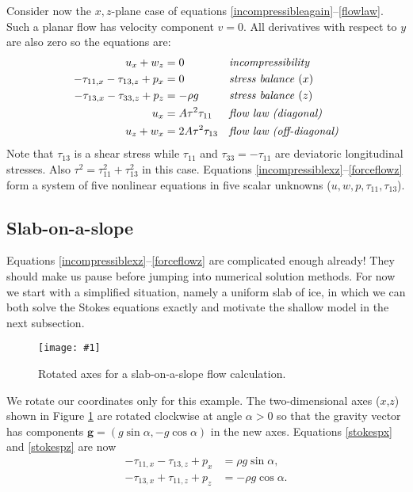 \documentclass[letterpaper,final,12pt,reqno]{amsart}
\newcommand{\onefigsize}[3]{
\begin{figure}[ht]
\centering
\texttt{[image: \#1]}
\caption{#2}
\label{fig:#1}
\end{figure}}
\newcommand{\onefig}[2]{\onefigsize{#1}{#2}{3.0in}}
\begin{document}
Consider now the $x,z$-plane case of equations \eqref{incompressibleagain}--\eqref{flowlaw}.  Such a planar flow has velocity component $v=0$.  All derivatives with respect to $y$ are also zero so the equations are:
\begin{align}
u_x + w_z &= 0 &&\text{\emph{incompressibility}} \label{incompressiblexz} \\
- \tau_{11,x} - \tau_{13,z} + p_x &= 0 &&\text{\emph{stress balance} ($x$)} \label{stokespx} \\
- \tau_{13,x} - \tau_{33,z} + p_z &= - \rho g &&\text{\emph{stress balance} ($z$)} \label{stokespz} \\
u_x &= A \tau^2 \tau_{11} &&\text{\emph{flow law (diagonal)}}  \label{forceflowx} \\
u_z + w _x &= 2 A \tau^2 \tau_{13} &&\text{\emph{flow law (off-diagonal)}} \label{forceflowz}
\end{align}
Note that $\tau_{13}$ is a shear stress while $\tau_{11}$ and $\tau_{33}=-\tau_{11}$ are deviatoric longitudinal stresses.  Also $\tau^2 = \tau_{11}^2+\tau_{13}^2$ in this case.  Equations \eqref{incompressiblexz}--\eqref{forceflowz} form a system of five nonlinear equations in five scalar unknowns ($u,w,p,\tau_{11},\tau_{13}$).

\subsection*{Slab-on-a-slope}  Equations \eqref{incompressiblexz}--\eqref{forceflowz} are complicated enough already!  They should make us pause before jumping into numerical solution methods.  For now we start with a simplified situation, namely a uniform slab of ice, in which we can both solve the Stokes equations exactly and motivate the shallow model in the next subsection.

\onefig{slab}{Rotated axes for a slab-on-a-slope flow calculation.}

We rotate our coordinates only for this example.  The two-dimensional axes ($x$,$z$) shown in Figure \ref{fig:slab} are rotated clockwise at angle $\alpha>0$ so that the gravity vector has components $\mathbf{g} = (g \sin\alpha,- g \cos \alpha)$ in the new axes.  Equations \eqref{stokespx} and \eqref{stokespz} are now
\begin{align}
- \tau_{11,x} - \tau_{13,z} + p_x &= \rho g \sin\alpha, \label{stokespxrot} \\
- \tau_{13,x} + \tau_{11,z} + p_z &= - \rho g \cos\alpha. \label{stokespzrot}
\end{align}
\end{document}
